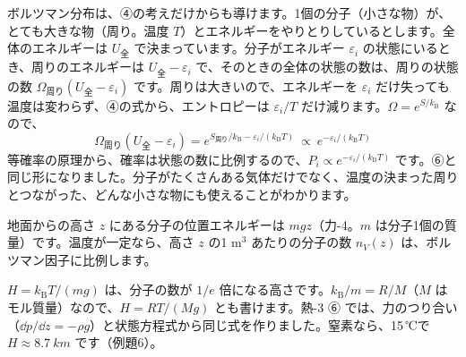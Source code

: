 \begin{motto}[4]
ボルツマン分布は、④の考えだけからも導けます。1個の分子（小さな物）が、とても大きな物（周り。温度 $T$）とエネルギーをやりとりしているとします。全体のエネルギーは $U_{\text{全}}$ で決まっています。分子がエネルギー $\varepsilon_i$ の状態にいるとき、周りのエネルギーは $U_{\text{全}}-\varepsilon_i$ で、そのときの全体の状態の数は、周りの状態の数 $\Omega_{\text{周り}}(U_{\text{全}}-\varepsilon_i)$ です。周りは大きいので、エネルギーを $\varepsilon_i$ だけ失っても温度は変わらず、④の式から、エントロピーは $\varepsilon_i/T$ だけ減ります。$\Omega=e^{S/k_{\mathrm B}}$ なので、
\[\Omega_{\text{周り}}(U_{\text{全}}-\varepsilon_i)=e^{S_{\text{周り}}/k_{\mathrm B}-\varepsilon_i/(k_{\mathrm B}T)}\ \propto\ e^{-\varepsilon_i/(k_{\mathrm B}T)}\]
等確率の原理から、確率は状態の数に比例するので、$P_i\propto e^{-\varepsilon_i/(k_{\mathrm B}T)}$ です。⑥と同じ形になりました。分子がたくさんある気体だけでなく、温度の決まった周りとつながった、どんな小さな物にも使えることがわかります。
\end{motto}

地面からの高さ $z$ にある分子の位置エネルギーは $mgz$（力-4。$m$ は分子1個の質量）です。温度が一定なら、高さ $z$ の1 m$^3$ あたりの分子の数 $n_V(z)$ は、ボルツマン因子に比例します。
\begin{phflow}[ボルツマン分布から]
\end{phflow}
$H=k_{\mathrm B}T/(mg)$ は、分子の数が $1/e$ 倍になる高さです。$k_{\mathrm B}/m=R/M$（$M$ はモル質量）なので、$H=RT/(Mg)$ とも書けます。熱-3 ⑥ では、力のつり合い（$\dd p/\dd z=-\rho g$）と状態方程式から同じ式を作りました。窒素なら、15\,℃で $H\approx\qty{8.7}{km}$ です（例題6）。

